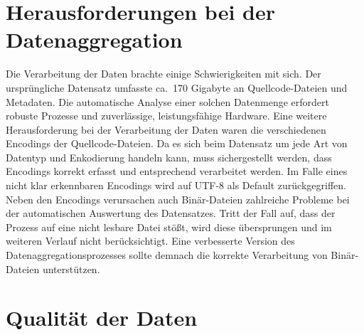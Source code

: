 
\section{Herausforderungen bei der Datenaggregation}\label{sec:herausforderungen-datenaggregation}

Die Verarbeitung der Daten brachte einige Schwierigkeiten mit sich.
Der ursprüngliche Datensatz umfasste ca.\ 170 Gigabyte an Quellcode-Dateien und Metadaten.
Die automatische Analyse einer solchen Datenmenge erfordert robuste Prozesse und zuverlässige, leistungsfähige Hardware.
Eine weitere Herausforderung bei der Verarbeitung der Daten waren die verschiedenen Encodings der Quellcode-Dateien.
Da es sich beim Datensatz um jede Art von Datentyp und Enkodierung handeln kann, muss sichergestellt werden, dass Encodings korrekt erfasst und entsprechend verarbeitet werden.
Im Falle eines nicht klar erkennbaren Encodings wird auf UTF-8 als Default zurückgegriffen.
Neben den Encodings verursachen auch Binär-Dateien zahlreiche Probleme bei der automatischen Auswertung des Datensatzes.
Tritt der Fall auf, dass der Prozess auf eine nicht lesbare Datei stößt, wird diese übersprungen und im weiteren Verlauf nicht berücksichtigt.
Eine verbesserte Version des Datenaggregationsprozesses sollte demnach die korrekte Verarbeitung von Binär-Dateien unterstützen.


\section{Qualität der Daten}\label{sec:qualitaet-der-daten}

